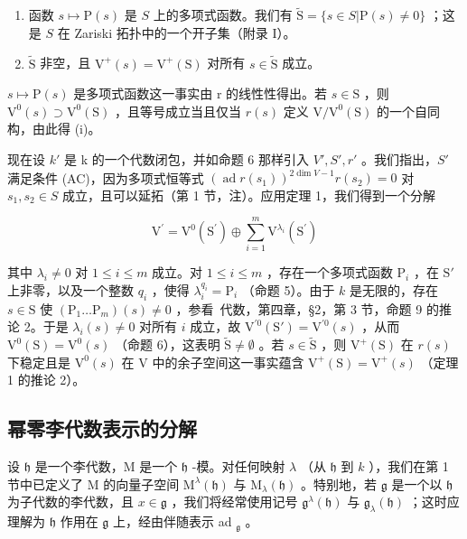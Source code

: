 \begin{enumerate}
\def\labelenumi{(\roman{enumi})}
\item
  函数 \(s \mapsto \mathrm{P}(s)\) 是 \(S\) 上的多项式函数。我们有 \(\tilde{\mathrm{S}} = \{s \in S | \mathrm{P}(s) \neq 0\}\) ；这是 \(S\) 在 Zariski 拓扑中的一个开子集（附录 I）。
\item
  \(\tilde{\mathrm{S}}\) 非空，且 \(\mathrm{V}^{+}(s) = \mathrm{V}^{+}(\mathrm{S})\) 对所有 \(s\in \tilde{\mathrm{S}}\) 成立。
\end{enumerate}

\(s \mapsto \mathrm{P}(s)\) 是多项式函数这一事实由 r 的线性性得出。若 \(s \in \mathrm{S}\) ，则 \(\mathrm{V}^{0}(s) \supset \mathrm{V}^{0}(\mathrm{S})\) ，且等号成立当且仅当 \(r(s)\) 定义 \(\mathrm{V}/\mathrm{V}^{0}(\mathrm{S})\) 的一个自同构，由此得 (i)。

现在设 \(k'\) 是 k 的一个代数闭包，并如命题 6 那样引入 \(V', S', r'\) 。我们指出，\(S'\) 满足条件 (AC)，因为多项式恒等式 \((\operatorname{ad} r(s_1))^{2\dim V-1}r(s_2) = 0\) 对 \(s_1, s_2 \in S\) 成立，且可以延拓（第 1 节，注）。应用定理 1，我们得到一个分解

\[
\mathrm{V} ^ {\prime} = \mathrm{V} ^ {0} (\mathrm{S} ^ {\prime}) \oplus \sum_ {i = 1} ^ {m} \mathrm{V} ^ {\lambda_ {i}} (\mathrm{S} ^ {\prime})
\]

其中 \(\lambda_{i} \neq 0\) 对 \(1 \leq i \leq m\) 成立。对 \(1 \leq i \leq m\) ，存在一个多项式函数 \(\mathrm{P}_{i}\) ，在 \(\mathrm{S}'\) 上非零，以及一个整数 \(q_{i}\) ，使得 \(\lambda_{i}^{q_{i}} = \mathrm{P}_{i}\) （命题 5）。由于 \(k\) 是无限的，存在 \(s \in \mathrm{S}\) 使 \((\mathrm{P}_{1} \ldots \mathrm{P}_{m})(s) \neq 0\) ，参看~代数，第四章，§2，第 3 节，命题 9 的推论 2。于是 \(\lambda_{i}(s) \neq 0\) 对所有 \(i\) 成立，故 \(\mathrm{V}^{\prime 0}(\mathrm{S}') = \mathrm{V}^{\prime 0}(s)\) ，从而 \(\mathrm{V}^{0}(\mathrm{S}) = \mathrm{V}^{0}(s)\) （命题 6），这表明 \(\tilde{\mathrm{S}} \neq \emptyset\) 。若 \(s \in \tilde{\mathrm{S}}\) ，则 \(\mathrm{V}^{+}(\mathrm{S})\) 在 \(r(s)\) 下稳定且是 \(\mathrm{V}^{0}(s)\) 在 V 中的余子空间这一事实蕴含 \(\mathrm{V}^{+}(\mathrm{S}) = \mathrm{V}^{+}(s)\) （定理 1 的推论 2）。

\subsection{幂零李代数表示的分解}

设 \(\mathfrak{h}\) 是一个李代数，M 是一个 \(\mathfrak{h}\) -模。对任何映射 \(\lambda\) （从 \(\mathfrak{h}\) 到 \(k\) ），我们在第 1 节中已定义了 M 的向量子空间 \(\mathrm{M}^{\lambda}(\mathfrak{h})\) 与 \(\mathrm{M}_{\lambda}(\mathfrak{h})\) 。特别地，若 \(\mathfrak{g}\) 是一个以 \(\mathfrak{h}\) 为子代数的李代数，且 \(x \in \mathfrak{g}\) ，我们将经常使用记号 \(\mathfrak{g}^{\lambda}(\mathfrak{h})\) 与 \(\mathfrak{g}_{\lambda}(\mathfrak{h})\) ；这时应理解为 \(\mathfrak{h}\) 作用在 \(\mathfrak{g}\) 上，经由伴随表示 ad \(_{\mathfrak{g}}\) 。

